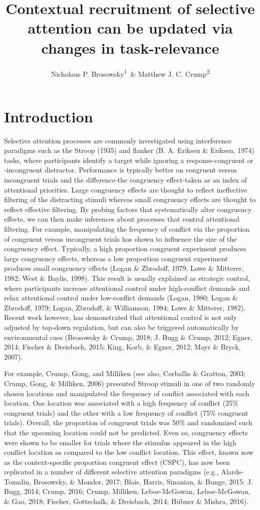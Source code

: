 \documentclass[english,,man,floatsintext]{apa6}
\title{Contextual recruitment of selective attention can be updated via changes
in task-relevance}
\author{Nicholaus P. Brosowsky\textsuperscript{1}~\& Matthew J. C.
Crump\textsuperscript{2}}
\date{}
\affiliation{
\vspace{0.5cm}
\textsuperscript{1} The Graduate Center of the City University of New York\\\textsuperscript{2} Brooklyn College of the City University of New York}
\begin{document}
\maketitle

\section{Introduction}\label{introduction}

Selective attention processes are commonly investigated using
interference paradigms such as the Stroop (1935) and flanker (B. A.
Eriksen \& Eriksen, 1974) tasks, where participants identify a target
while ignoring a response-congruent or -incongruent distractor.
Performance is typically better on congruent versus incongruent trials
and the difference-the congruency effect-taken as an index of
attentional priorities. Large congruency effects are thought to reflect
ineffective filtering of the distracting stimuli whereas small
congruency effects are thought to reflect effective filtering. By
probing factors that systematically alter congruency effects, we can
then make inferences about processes that control attentional filtering.
For example, manipulating the frequency of conflict via the proportion
of congruent versus incongruent trials has shown to influence the size
of the congruency effect. Typically, a high proportion congruent
experiment produces large congruency effects, whereas a low proportion
congruent experiment produces small congruency effects (Logan \&
Zbrodoff, 1979; Lowe \& Mitterer, 1982; West \& Baylis, 1998). This
result is usually explained as strategic control, where participants
increase attentional control under high-conflict demands and relax
attentional control under low-conflict demands (Logan, 1980; Logan \&
Zbrodoff, 1979; Logan, Zbrodoff, \& Williamson, 1984; Lowe \& Mitterer,
1982). Recent work however, has demonstrated that attentional control is
not only adjusted by top-down regulation, but can also be triggered
automatically by environmental cues (Brosowsky \& Crump, 2018; J. Bugg
\& Crump, 2012; Egner, 2014; Fischer \& Dreisbach, 2015; King, Korb, \&
Egner, 2012; Mayr \& Bryck, 2007).

For example, Crump, Gong, and Milliken (see also, Corballis \& Gratton,
2003; Crump, Gong, \& Milliken, 2006) presented Stroop stimuli in one of
two randomly chosen locations and manipulated the frequency of conflict
associated with each location. One location was associated with a high
frequency of conflict (25\% congruent trials) and the other with a low
frequency of conflict (75\% congruent trials). Overall, the proportion
of congruent trials was 50\% and randomized such that the upcoming
location could not be predicted. Even so, congruency effects were shown
to be smaller for trials where the stimulus appeared in the high
conflict location as compared to the low conflict location. This effect,
known now as the context-specific proportion congruent effect (CSPC),
has now been replicated in a number of different selective attention
paradigms (e.g., Alards-Tomalin, Brosowsky, \& Mondor, 2017; Blais,
Harris, Sinanian, \& Bunge, 2015; J. Bugg, 2014; Crump, 2016; Crump,
Milliken, Leboe-McGowan, Leboe-McGowan, \& Gao, 2018; Fischer,
Gottschalk, \& Dreisbach, 2014; Hübner \& Mishra, 2016).
\end{document}
